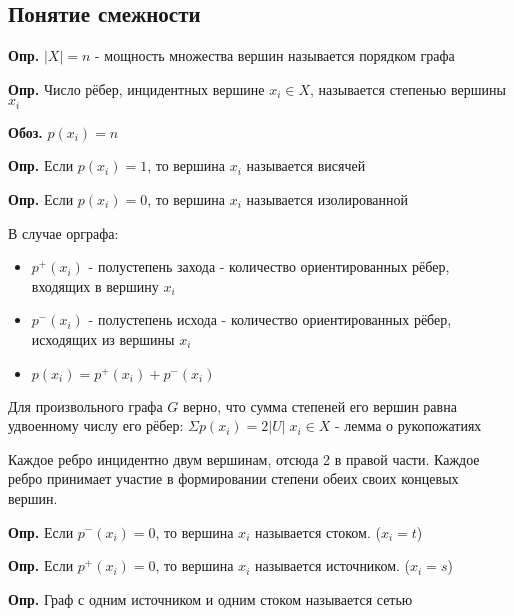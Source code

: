\documentclass[10pt]{article}
\begin{document}
\subsection*{Понятие смежности}
\par\textbf{Опр.} $|X| = n$ - мощность множества вершин называется порядком графа
\par\textbf{Опр.} Число рёбер, инцидентных вершине $x_{i} \in X$, называется степенью вершины $x_{i}$
\par\textbf{Обоз.} $p(x_{i}) = n$
\par\textbf{Опр.} Если $p(x_{i}) = 1$, то вершина $x_{i}$ называется висячей
\par\textbf{Опр.} Если $p(x_{i}) = 0$, то вершина $x_{i}$ называется изолированной
\par В случае орграфа:
\begin{itemize}
\item $p^+(x_{i})$ - полустепень захода - количество ориентированных рёбер, входящих в вершину $x_{i}$
\item $p^-(x_{i})$ - полустепень исхода - количество ориентированных рёбер, исходящих из вершины $x_i$
\item $p(x_{i}) = p^+(x_{i}) + p^-(x_{i})$
\end{itemize}

\par Для произвольного графа $G$ верно, что сумма степеней его вершин равна удвоенному числу его рёбер: $\Sigma p(x_{i}) = 2 |U| \; x_{i} \in X$ - лемма о рукопожатиях
\par Каждое ребро инцидентно двум вершинам, отсюда 2 в правой части. Каждое ребро принимает участие в формировании степени обеих своих концевых вершин.
\par\textbf{Опр.} Если $p^-(x_{i}) = 0$, то вершина $x_{i}$ называется стоком. ($x_{i} = t$)
\par\textbf{Опр.} Если $p^+(x_{i}) = 0$, то вершина $x_{i}$ называется источником. ($x_{i} = s$)
\par\textbf{Опр.} Граф с одним источником и одним стоком называется сетью

\end{document}
